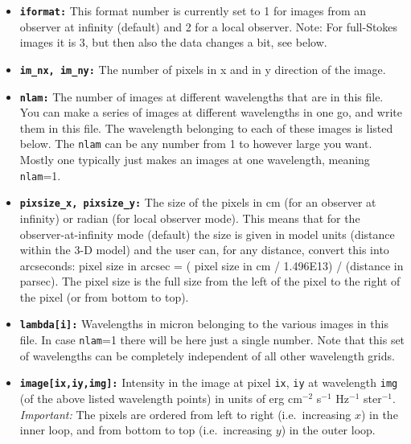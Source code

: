\documentclass{report}
\begin{document}
\begin{itemize}
\item[] {\small\tt\bf iformat:} This format number is currently set to 1 
for images from an observer at infinity (default) and 2 for a local observer.
Note: For full-Stokes images it is 3, but then also the data changes a
bit, see below.
\item[] {\small\tt\bf im\_nx, im\_ny:} The number of pixels in x and in y
  direction of the image.
\item[] {\small\tt\bf nlam:} The number of images at different wavelengths that
are in this file. You can make a series of images at different wavelengths
in one go, and write them in this file. The wavelength belonging to each of
these images is listed below. The {\small\tt nlam} can be any number from 1 to
however large you want. Mostly one typically just makes an images at one
wavelength, meaning {\small\tt nlam}=1. 
\item[] {\small\tt\bf pixsize\_x, pixsize\_y:} The size of the pixels in cm
  (for an observer at infinity) or radian (for local observer mode).  This
  means that for the observer-at-infinity mode (default) the size is given
  in model units (distance within the 3-D model) and the user can, for any
  distance, convert this into arcseconds: pixel size in arcsec = ( pixel
  size in cm / 1.496E13) / (distance in parsec). The pixel size is the full
  size from the left of the pixel to the right of the pixel (or from bottom
  to top).
\item[] {\small\tt\bf lambda[i]:} Wavelengths in micron belonging to the various
  images in this file. In case {\small\tt nlam}=1 there will be here just a
  single number. Note that this set of wavelengths can be completely
  independent of all other wavelength grids. 
\item[] {\small\tt\bf image[ix,iy,img]:} Intensity in the image at pixel
  {\small\tt ix}, {\small\tt iy} at wavelength {\small\tt img} (of the above
  listed wavelength points) in units of erg cm$^{-2}$ s$^{-1}$ Hz$^{-1}$
  ster$^{-1}$. {\em Important:} The pixels are ordered from left to right
  (i.e.\ increasing $x$) in the inner loop, and from bottom to
  top (i.e.\ increasing $y$) in the outer loop.
\end{itemize}
\end{document}
